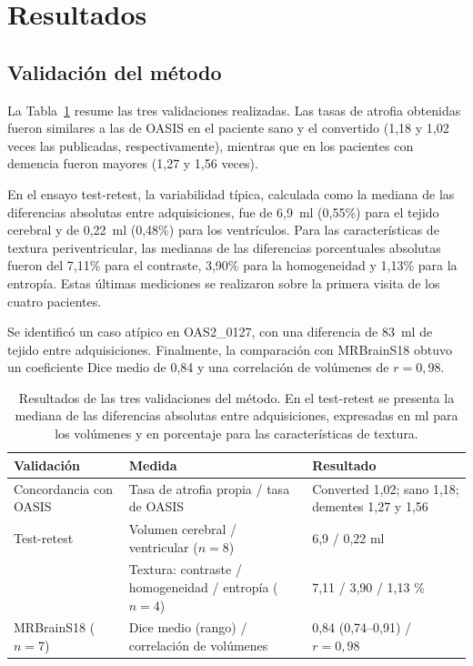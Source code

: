 \documentclass[10pt]{article}
\begin{document}
\section{Resultados}

\subsection{Validación del método}

La Tabla~\ref{tab:validacion} resume las tres validaciones realizadas. Las tasas de atrofia obtenidas fueron similares a las de OASIS en el paciente sano y el convertido (1,18 y 1,02 veces las publicadas, respectivamente), mientras que en los pacientes con demencia fueron mayores (1,27 y 1,56 veces).

En el ensayo test-retest, la variabilidad típica, calculada como la mediana de las diferencias absolutas entre adquisiciones, fue de 6,9~ml (0,55\%) para el tejido cerebral y de 0,22~ml (0,48\%) para los ventrículos. Para las características de textura periventricular, las medianas de las diferencias porcentuales absolutas fueron del 7,11\% para el contraste, 3,90\% para la homogeneidad y 1,13\% para la entropía. Estas últimas mediciones se realizaron sobre la primera visita de los cuatro pacientes.

Se identificó un caso atípico en OAS2\_0127, con una diferencia de 83~ml de tejido entre adquisiciones. Finalmente, la comparación con MRBrainS18 obtuvo un coeficiente Dice medio de 0,84 y una correlación de volúmenes de $r=0{,}98$.

\begin{table}[H]
    \centering
    \small
    \renewcommand{\arraystretch}{1.2}
    \begin{tabular}{p{2.7cm} p{5.6cm} p{4.3cm}}
        \toprule
        \textbf{Validación} & \textbf{Medida} & \textbf{Resultado} \\
        \midrule

        Concordancia con OASIS
        & Tasa de atrofia propia / tasa de OASIS
        & Converted 1,02; sano 1,18; dementes 1,27 y 1,56 \\
        \midrule

        Test-retest
        & Volumen cerebral / ventricular ($n=8$)
        & 6,9 / 0,22 ml \\

        & Textura: contraste / homogeneidad / entropía ($n=4$)
        & 7,11 / 3,90 / 1,13 \% \\
        \midrule

        MRBrainS18 ($n=7$)
        & Dice medio (rango) / correlación de volúmenes
        & 0,84 (0,74--0,91) / $r=0,98$ \\

        \bottomrule
    \end{tabular}

    \caption{Resultados de las tres validaciones del método. En el test-retest se presenta la mediana de las diferencias absolutas entre adquisiciones, expresadas en ml para los volúmenes y en porcentaje para las características de textura.}
    \label{tab:validacion}
\end{table}
 
\end{document}
